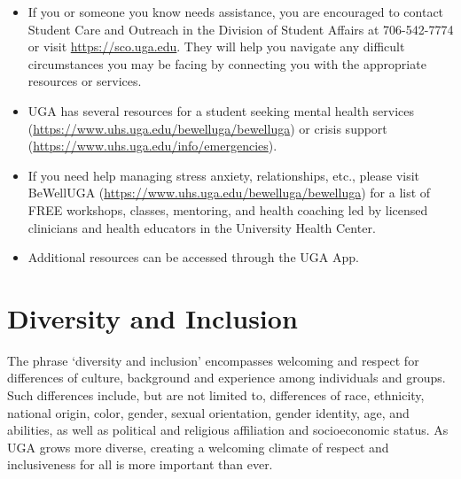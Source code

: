 \documentclass[12pt]{article}
\begin{document}
\begin{itemize}
  \item If you or someone you know needs assistance, you are
    encouraged to contact Student Care and Outreach in the Division of
    Student Affairs at 706-542-7774 or visit \url{https://sco.uga.edu}. They
    will help you navigate any difficult circumstances you may be facing
    by connecting you with the appropriate resources or services.
  \item UGA has several resources for a student seeking mental health
    services (\url{https://www.uhs.uga.edu/bewelluga/bewelluga}) or crisis
    support (\url{https://www.uhs.uga.edu/info/emergencies}).
  \item If you need help managing stress anxiety, relationships, etc.,
    please visit BeWellUGA (\url{https://www.uhs.uga.edu/bewelluga/bewelluga})
    for a list of FREE workshops, classes, mentoring, and health
    coaching led by licensed clinicians and health educators in the
    University Health Center.
  \item Additional resources can be accessed through the UGA App.
\end{itemize}


\vspace{-2mm}
\section*{\normalsize Diversity and Inclusion}
\vspace{-4mm}
The phrase ‘diversity and inclusion’ encompasses welcoming and respect
for differences of culture, background and experience among
individuals and groups. Such differences include, but are not limited
to, differences of race, ethnicity, national origin, color, gender,
sexual orientation, gender identity, age, and abilities, as well as
political and religious affiliation and socioeconomic status. As UGA
grows more diverse, creating a welcoming climate of respect and
inclusiveness for all is more important than ever. 




\end{document}

